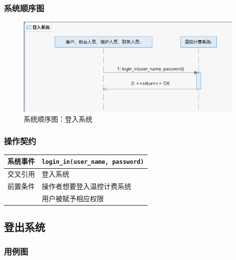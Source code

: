 \documentclass[blue,normal,cn]{elegantnote}
\newcommand{\code}[1]{\colorbox{light-gray}{\texttt{#1}}}
\begin{document}
\subsubsection{系统顺序图}

\begin{figure}[H]
    \centering
    \includegraphics[width=.8\textwidth]{fig/276008.png}
    \caption{系统顺序图：登入系统}
    \label{fig:276008}
\end{figure}

\subsubsection{操作契约}

\begin{center}
    \begin{tabular}{|>{\centering}m{}|m{}|}
        \hline
        系统事件                  & \multicolumn{1}{l|}{\code{login\_in(user\_name, password)}} \\
        \hline
        交叉引用                  & 登入系统                                                    \\
        \hline
        前置条件                  & 操作者想要登入温控计费系统                                  \\
        \hline
        \multirow{1}{*}{后置条件} & 用户被赋予相应权限                                          \\
        \hline
    \end{tabular}
\end{center}

\subsection{登出系统}
\subsubsection{用例图}
\end{document}
